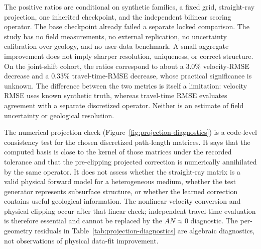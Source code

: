 \documentclass[11pt]{article}
\begin{document}
The positive ratios are conditional on synthetic families, a fixed grid, straight-ray projection, one inherited checkpoint, and the independent bilinear scoring operator. The base checkpoint already failed a separate locked comparison. The study has no field measurements, no external replication, no uncertainty calibration over geology, and no user-data benchmark. A small aggregate improvement does not imply sharper resolution, uniqueness, or correct structure. On the joint-shift cohort, the ratios correspond to about a 3.0\% velocity-RMSE decrease and a 0.33\% travel-time-RMSE decrease, whose practical significance is unknown. The difference between the two metrics is itself a limitation: velocity RMSE uses known synthetic truth, whereas travel-time RMSE evaluates agreement with a separate discretized operator. Neither is an estimate of field uncertainty or geological resolution.

The numerical projection check (Figure~\ref{fig:projection-diagnostics}) is a code-level consistency test for the chosen discretized path-length matrices. It says that the computed basis is close to the kernel of those matrices under the recorded tolerance and that the pre-clipping projected correction is numerically annihilated by the same operator. It does not assess whether the straight-ray matrix is a valid physical forward model for a heterogeneous medium, whether the test generator represents subsurface structure, or whether the learned correction contains useful geological information. The nonlinear velocity conversion and physical clipping occur after that linear check; independent travel-time evaluation is therefore essential and cannot be replaced by the $AN\approx0$ diagnostic. The per-geometry residuals in Table~\ref{tab:projection-diagnostics} are algebraic diagnostics, not observations of physical data-fit improvement.
\end{document}
